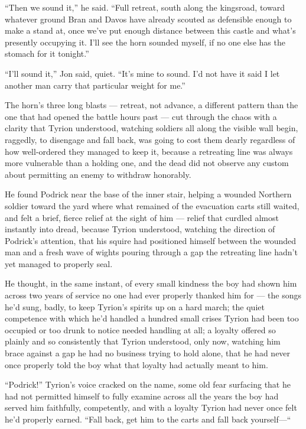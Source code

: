 “Then we sound it,” he said. “Full retreat, south along the kingsroad, toward whatever ground Bran and Davos have already scouted as defensible enough to make a stand at, once we’ve put enough distance between this castle and what’s presently occupying it. I’ll see the horn sounded myself, if no one else has the stomach for it tonight.”

“I’ll sound it,” Jon said, quiet. “It’s mine to sound. I’d not have it said I let another man carry that particular weight for me.”

\sceneBreak

The horn’s three long blasts — retreat, not advance, a different pattern than the one that had opened the battle hours past — cut through the chaos with a clarity that Tyrion understood, watching soldiers all along the visible wall begin, raggedly, to disengage and fall back, was going to cost them dearly regardless of how well-ordered they managed to keep it, because a retreating line was always more vulnerable than a holding one, and the dead did not observe any custom about permitting an enemy to withdraw honorably.

He found Podrick near the base of the inner stair, helping a wounded Northern soldier toward the yard where what remained of the evacuation carts still waited, and felt a brief, fierce relief at the sight of him — relief that curdled almost instantly into dread, because Tyrion understood, watching the direction of Podrick’s attention, that his squire had positioned himself between the wounded man and a fresh wave of wights pouring through a gap the retreating line hadn’t yet managed to properly seal.

He thought, in the same instant, of every small kindness the boy had shown him across two years of service no one had ever properly thanked him for — the songs he’d sung, badly, to keep Tyrion’s spirits up on a hard march; the quiet competence with which he’d handled a hundred small crises Tyrion had been too occupied or too drunk to notice needed handling at all; a loyalty offered so plainly and so consistently that Tyrion understood, only now, watching him brace against a gap he had no business trying to hold alone, that he had never once properly told the boy what that loyalty had actually meant to him.

“Podrick!” Tyrion’s voice cracked on the name, some old fear surfacing that he had not permitted himself to fully examine across all the years the boy had served him faithfully, competently, and with a loyalty Tyrion had never once felt he’d properly earned. “Fall back, get him to the carts and fall back yourself—“

